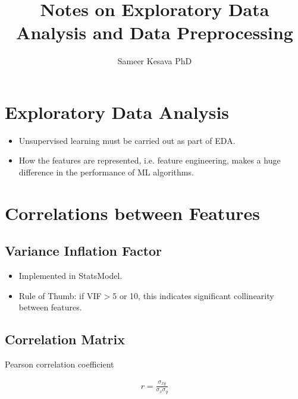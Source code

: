 \documentclass[a4paper, 12pt]{report}
\begin{document}
\title{Notes on Exploratory Data Analysis and Data Preprocessing}
\author{Sameer Kesava PhD}
\date{} %
\maketitle

\tableofcontents
\newpage



\chapter{Exploratory Data Analysis}
\begin{itemize}
\item Unsupervised learning must be carried out as part of EDA.
\item How the features are represented, i.e. feature engineering, makes a huge difference in the performance of ML algorithms.

\end{itemize}

\chapter{Correlations between Features}

\section{Variance Inflation Factor}
\begin{itemize}
\item Implemented in {\color{green}StatsModel}.
\item Rule of Thumb: if VIF$>$5 or 10, this indicates significant collinearity between features.

\end{itemize}

\section{Correlation Matrix}

Pearson correlation coefficient

\begin{align}
	r = \frac{\sigma{_{xy}}}{\sigma{_{x}}\sigma{_{y}}}
\end{align}
\end{document}
